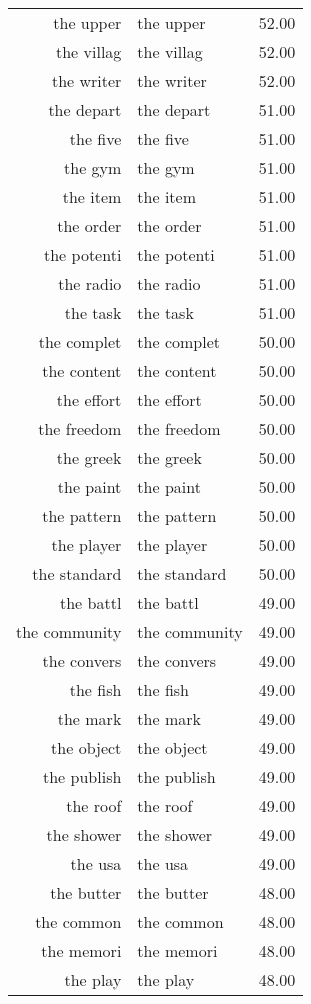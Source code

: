 \begin{table}[ht]
\begin{tabular}{rlr}
  the upper & the upper & 52.00 \\ 
  the villag & the villag & 52.00 \\ 
  the writer & the writer & 52.00 \\ 
  the depart & the depart & 51.00 \\ 
  the five & the five & 51.00 \\ 
  the gym & the gym & 51.00 \\ 
  the item & the item & 51.00 \\ 
  the order & the order & 51.00 \\ 
  the potenti & the potenti & 51.00 \\ 
  the radio & the radio & 51.00 \\ 
  the task & the task & 51.00 \\ 
  the complet & the complet & 50.00 \\ 
  the content & the content & 50.00 \\ 
  the effort & the effort & 50.00 \\ 
  the freedom & the freedom & 50.00 \\ 
  the greek & the greek & 50.00 \\ 
  the paint & the paint & 50.00 \\ 
  the pattern & the pattern & 50.00 \\ 
  the player & the player & 50.00 \\ 
  the standard & the standard & 50.00 \\ 
  the battl & the battl & 49.00 \\ 
  the community & the community & 49.00 \\ 
  the convers & the convers & 49.00 \\ 
  the fish & the fish & 49.00 \\ 
  the mark & the mark & 49.00 \\ 
  the object & the object & 49.00 \\ 
  the publish & the publish & 49.00 \\ 
  the roof & the roof & 49.00 \\ 
  the shower & the shower & 49.00 \\ 
  the usa & the usa & 49.00 \\ 
  the butter & the butter & 48.00 \\ 
  the common & the common & 48.00 \\ 
  the memori & the memori & 48.00 \\ 
  the play & the play & 48.00 \\ 

\end{tabular}
\end{table}
